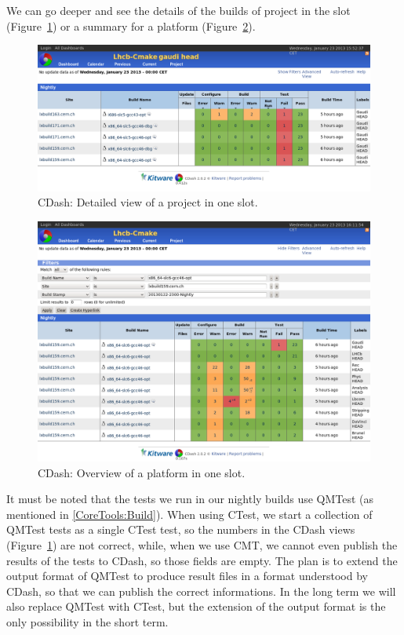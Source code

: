 \documentclass{lhcbnote}
\begin{document}
We can go deeper and see the details of the builds of project in the slot
(Figure~\ref{fig:cdash-project}) or a summary for a platform
(Figure~\ref{fig:cdash-platform}).

\begin{figure}
  \begin{center}
    \includegraphics[width=15cm]{images/cdash-3}
  \end{center}
  \caption{CDash: Detailed view of a project in one slot.}
  \label{fig:cdash-project}
\end{figure}

\begin{figure}
  \begin{center}
    \includegraphics[width=15cm]{images/cdash-4}
  \end{center}
  \caption{CDash: Overview of a platform in one slot.}
  \label{fig:cdash-platform}
\end{figure}

It must be noted that the tests we run in our nightly builds use
QMTest\cite{QMTestPaper} (as mentioned in \ref{CoreTools:Build}).  When using
CTest, we start a collection of QMTest tests as a single CTest test, so the
numbers in the CDash views (Figure~\ref{fig:cdash-project}) are not correct,
while, when we use CMT, we cannot even publish the results of the tests to
CDash, so those fields are empty.  The plan is to extend the output format of
QMTest to produce result files in a format understood by CDash, so that we can
publish the correct informations.  In the long term we will also replace QMTest
with CTest, but the extension of the output format is the only possibility in
the short term.
\end{document}
